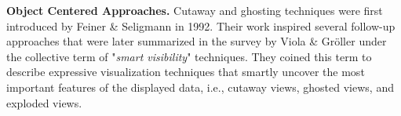 \noindent
\textbf{Object Centered Approaches.}
Cutaway and ghosting techniques were first introduced by Feiner \& Seligmann \cite{feiner92} in 1992.
Their work inspired several follow-up approaches \cite{diep02, diep03, weiskopf03, viola2004importance, Viola05, Kruger05} that were later summarized in the survey by Viola \& Gr{\"o}ller \cite{violasmart05} under the collective term of "\textit{smart visibility}" techniques. They coined this term to describe expressive visualization techniques that smartly uncover the most important features of the displayed data, i.e., cutaway views, ghosted views, and exploded views. 

